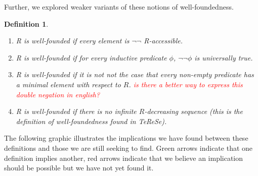 \documentclass{scrartcl}
\newtheorem{dfn}[thm]{Definition}
\begin{document}
  Further, we explored weaker variants of these notions of well-foundedness.
  \begin{dfn} \hfil
    \begin{enumerate}
      \item \textit{R} is well-founded if every element is $\lnot \lnot$  \textit{R}-accessible.
      \item \textit{R} is well-founded if for every inductive predicate $\phi$, $\lnot \lnot \phi$ is universally true.
      \item \textit{R} is well-founded if it is not not the case that every non-empty predicate has a minimal element with respect to $R$. \textcolor{red}{is there a better way to express this double negation in english?}
      \item \textit{R} is well-founded if there is no infinite $R$-decreasing sequence (this is the definition of well-foundedness found in TeReSe).
    \end{enumerate}

\end{dfn}
The following graphic illustrates the implications we have found between these definitions and those we are still seeking to find. Green arrows indicate that one definition implies another, red arrows indicate that we believe an implication should be possible but we have not yet found it.
\end{document}
